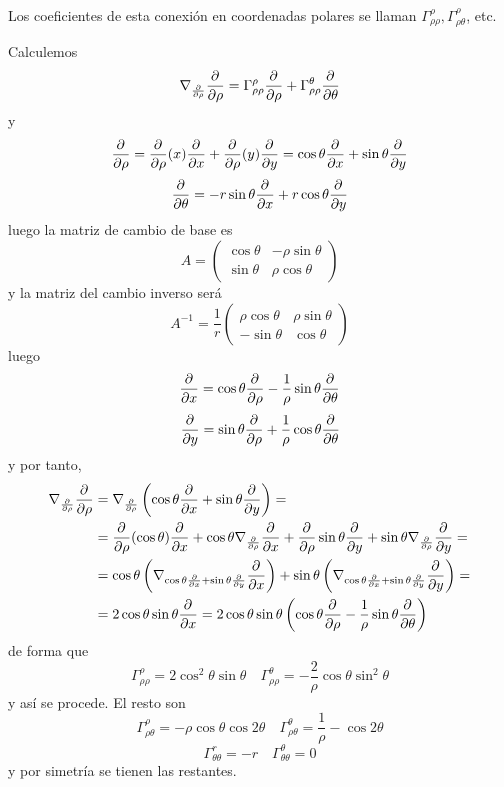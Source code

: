  \begin{sol}
     Los coeficientes de esta conexi\'on en coordenadas polares se llaman $\Gamma_{\rho\rho}^{\rho}, \Gamma_{\rho\theta}^{\rho}$, etc.

     Calculemos
     $$\nabla_{\frac{\partial}{\partial \rho}} \dfrac{\partial^{} }{\partial \rho}=\Gamma_{\rho\rho}^{\rho} \dfrac{\partial^{} }{\partial \rho} + \Gamma_{\rho \rho}^{\theta} \dfrac{\partial^{} }{\partial \theta}$$
     y 
     $$\dfrac{\partial^{} }{\partial \rho} = \dfrac{\partial^{} }{\partial \rho} (x) \dfrac{\partial^{} }{\partial x} + \dfrac{\partial^{} }{\partial \rho} (y) \dfrac{\partial^{} }{\partial y} = \cos \theta \dfrac{\partial^{} }{\partial x} +\sin \theta \dfrac{\partial^{} }{\partial y} $$
     $$\dfrac{\partial^{} }{\partial \theta} = -r \sin \theta \dfrac{\partial^{} }{\partial x} + r \cos \theta \dfrac{\partial^{} }{\partial y}$$
     luego la matriz de cambio de base es 
     $$A = \begin{pmatrix}
         \cos \theta & -\rho \sin \theta \\ \sin \theta & \rho \cos \theta
     \end{pmatrix}$$
     y la matriz del cambio inverso ser\'a 
     $$A^{-1} = \dfrac{1}{r}\begin{pmatrix}
         \rho \cos \theta & \rho \sin \theta \\ -\sin \theta & \cos \theta 
     \end{pmatrix}$$
     luego 
     $$\dfrac{\partial^{} }{\partial x} = \cos \theta \dfrac{\partial^{} }{\partial \rho} - \dfrac{1}{\rho} \sin \theta \dfrac{\partial^{} }{\partial \theta}$$
     $$\dfrac{\partial^{} }{\partial y} = \sin \theta \dfrac{\partial^{} }{\partial \rho}+ \dfrac{1}{\rho} \cos \theta \dfrac{\partial^{} }{\partial \theta}$$
     y por tanto,
     \[ \begin{split}\nabla_{\frac{\partial}{\partial \rho}} \dfrac{\partial^{} }{\partial \rho} & = \nabla_{\frac{\partial}{\partial \rho}} \left(\cos \theta \dfrac{\partial^{} }{\partial x} + \sin \theta \dfrac{\partial^{} }{\partial y} \right) = \\ & = \dfrac{\partial^{} }{\partial \rho} (\cos \theta ) \dfrac{\partial^{} }{\partial x} + \cos \theta \nabla_{\frac{\partial}{\partial \rho}} \dfrac{\partial^{} }{\partial x} + \dfrac{\partial^{} }{\partial \rho} \sin \theta \dfrac{\partial^{} }{\partial y} + \sin \theta \nabla_{\frac{\partial}{\partial \rho}} \dfrac{\partial^{} }{\partial y} = \\ & = \cos \theta \left( \nabla_{\cos\theta \frac{\partial}{\partial x} +\sin \theta \frac{\partial}{\partial y}} \dfrac{\partial^{} }{\partial x} \right)+  \sin \theta \left( \nabla_{\cos\theta \frac{\partial}{\partial x} +\sin \theta \frac{\partial}{\partial y}} \dfrac{\partial^{} }{\partial y} \right) = \\ & = 2\cos \theta \sin \theta \dfrac{\partial^{} }{\partial x} = 2\cos \theta \sin \theta \left( \cos \theta \dfrac{\partial^{} }{\partial \rho} - \dfrac{1}{\rho} \sin \theta \dfrac{\partial^{} }{\partial \theta}\right)  \end{split}\]
      de forma que 
      $$\Gamma_{\rho \rho}^{\rho} = 2\cos^2\theta \sin \theta \quad \Gamma_{\rho \rho}^{\theta} = -\dfrac{2}{\rho} \cos \theta \sin^2 \theta$$
      y as\'i se procede. El resto son 
      $$\Gamma_{\rho \theta}^{\rho} = -\rho \cos \theta \cos 2\theta \quad \Gamma_{\rho \theta}^{\theta} = \dfrac{1}{\rho} - \cos 2\theta$$
      $$\Gamma_{\theta \theta}^r = -r \quad \Gamma_{\theta \theta}^{\theta}=0$$
      y por simetr\'ia se tienen las restantes.
 \end{sol}
